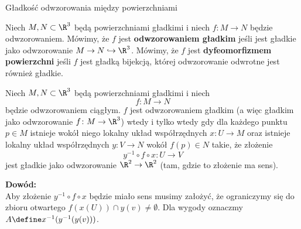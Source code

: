 \begin{frame}{Gładkość odwzorowania między powierzchniami}

\begin{definicja}
Niech $M,N\subset \R^3$ będą powierzchniami gładkimi i niech $f\colon M\to N$ będzie odwzorowaniem. Mówimy, że $f$ jest \textbf{odwzorowaniem gładkim} jeśli jest gładkie jako odwzorowanie $M\to N\hookrightarrow\R^3$. Mówimy, że $f$ jest \textbf{dyfeomorfizmem powierzchni} jeśli $f$ jest gładką bijekcją, której odwzorowanie odwrotne jest również gładkie.
\end{definicja}

\end{frame}
\begin{frame}[<+->]

\begin{lemat}
Niech $M,N\subset \R^3$ będą powierzchniami gładkimi i niech \[f\colon M\to N\] będzie odwzorowaniem ciągłym. $f$ jest odwzorowaniem gładkim (a więc gładkim jako odwzorowanie $f\colon M\to \R^3$) wtedy i tylko wtedy gdy dla każdego punktu $p\in M$ istnieje wokół niego lokalny układ współrzędnych $x\colon U\to M$ oraz istnieje lokalny układ współrzędnych $y\colon V\to N$ wokół $f(p)\in N$ takie, że złożenie
\[y^{-1}\circ f\circ x\colon U\to V\]
jest gładkie jako odwzorowanie $\R^2\to \R^2$ (tam, gdzie to złożenie ma sens).
\end{lemat}

\end{frame}
\begin{frame}[<+->]
\begin{center}

\end{center}

\end{frame}

\textcolor{ared}{\textbf{Dowód:}}\\

\pause Aby złożenie $y^{-1}\circ f\circ x$ będzie miało sens musimy założyć, że ograniczymy się do zbioru otwartego $f(x(U))\cap y(v)\neq \emptyset$. Dla wygody oznaczmy $A\define x^{-1}(y^{-1}(y(v)))$.

